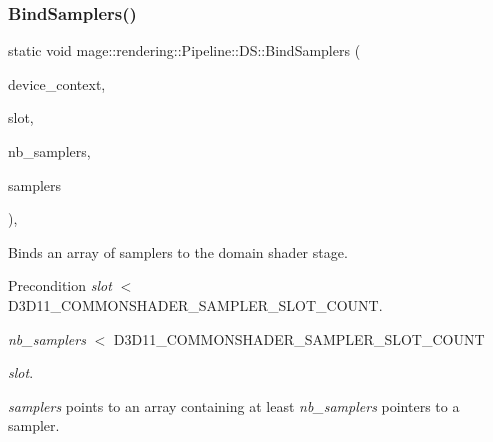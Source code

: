 \subsubsection{\texorpdfstring{Bind\+Samplers()}{BindSamplers()}}
{\footnotesize\ttfamily static void mage\+::rendering\+::\+Pipeline\+::\+D\+S\+::\+Bind\+Samplers (\begin{DoxyParamCaption}\item[{I\+D3\+D11\+Device\+Context \&}]{device\+\_\+context,  }\item[{\mbox{\hyperlink{namespacemage_aa5d6eaabaac3cdd01873d6a3d27e90f3}{U32}}}]{slot,  }\item[{\mbox{\hyperlink{namespacemage_aa5d6eaabaac3cdd01873d6a3d27e90f3}{U32}}}]{nb\+\_\+samplers,  }\item[{I\+D3\+D11\+Sampler\+State $\ast$const $\ast$}]{samplers }\end{DoxyParamCaption})\hspace{0.3cm}{\ttfamily [static]}, {\ttfamily [noexcept]}}

Binds an array of samplers to the domain shader stage.

\begin{DoxyPrecond}{Precondition}
{\itshape slot} $<$ {\ttfamily D3\+D11\+\_\+\+C\+O\+M\+M\+O\+N\+S\+H\+A\+D\+E\+R\+\_\+\+S\+A\+M\+P\+L\+E\+R\+\_\+\+S\+L\+O\+T\+\_\+\+C\+O\+U\+NT}. 

{\itshape nb\+\_\+samplers} $<$ {\ttfamily D3\+D11\+\_\+\+C\+O\+M\+M\+O\+N\+S\+H\+A\+D\+E\+R\+\_\+\+S\+A\+M\+P\+L\+E\+R\+\_\+\+S\+L\+O\+T\+\_\+\+C\+O\+U\+NT} 
\begin{DoxyItemize}
\item {\itshape slot}. 
\end{DoxyItemize}

{\itshape samplers} points to an array containing at least {\itshape nb\+\_\+samplers} pointers to a sampler. 
\end{DoxyPrecond}

